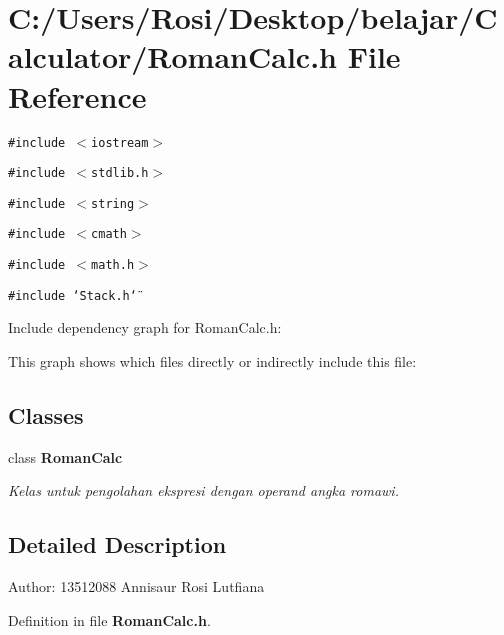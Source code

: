 \section{C:/Users/Rosi/Desktop/belajar/Calculator/Roman\-Calc.h File Reference}
\label{_roman_calc_8h}
{\tt \#include $<$iostream$>$}\par
{\tt \#include $<$stdlib.h$>$}\par
{\tt \#include $<$string$>$}\par
{\tt \#include $<$cmath$>$}\par
{\tt \#include $<$math.h$>$}\par
{\tt \#include \char`\"{}Stack.h\char`\"{}}\par


Include dependency graph for Roman\-Calc.h:

This graph shows which files directly or indirectly include this file:\subsection*{Classes}
\begin{CompactItemize}
\item 
class {\bf Roman\-Calc}
\begin{CompactList}\small\item\em Kelas untuk pengolahan ekspresi dengan operand angka romawi. \item\end{CompactList}\end{CompactItemize}


\subsection{Detailed Description}
\begin{Desc}
\item[Author:]13512088 Annisaur Rosi Lutfiana \end{Desc}


Definition in file {\bf Roman\-Calc.h}.